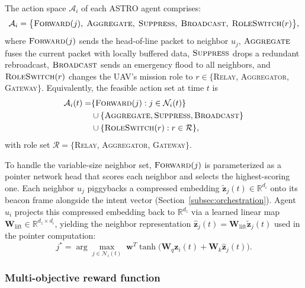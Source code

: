 \documentclass[5p,times]{elsarticle}
\begin{document}
The action space $\mathcal{A}_i$ of each ASTRO agent comprises:
\begin{equation}
\label{eq:action_space}
\mathcal{A}_i = \big\{\textsc{Forward}(j),\; \textsc{Aggregate},\; \textsc{Suppress},\; \textsc{Broadcast},\; \textsc{RoleSwitch}(r)\big\},
\end{equation}
where $\textsc{Forward}(j)$ sends the head-of-line packet to neighbor $u_j$, $\textsc{Aggregate}$ fuses the current packet with locally buffered data, $\textsc{Suppress}$ drops a redundant rebroadcast, $\textsc{Broadcast}$ sends an emergency flood to all neighbors, and $\textsc{RoleSwitch}(r)$ changes the UAV's mission role to $r \in \{$\textsc{Relay}, \textsc{Aggregator}, \textsc{Gateway}$\}$.
Equivalently, the feasible action set at time $t$ is
\begin{equation}
\label{eq:action_space_feasible}
\begin{aligned}
\mathcal{A}_i(t)=&\{\textsc{Forward}(j):j\in\mathcal{N}_i(t)\}\\
&\cup\{\textsc{Aggregate},\textsc{Suppress},\textsc{Broadcast}\}\\
&\cup\{\textsc{RoleSwitch}(r):r\in\mathcal{R}\},
\end{aligned}
\end{equation}
with role set $\mathcal{R}=\{$\textsc{Relay}, \textsc{Aggregator}, \textsc{Gateway}$\}$.

To handle the variable-size neighbor set, $\textsc{Forward}(j)$ is parameterized as a pointer network head that scores each neighbor and selects the highest-scoring one. Each neighbor $u_j$ piggybacks a compressed embedding $\tilde{\mathbf{z}}_j(t) \in \mathbb{R}^{d_\iota}$ onto its beacon frame alongside the intent vector (Section~\ref{subsec:orchestration}). Agent $u_i$ projects this compressed embedding back to $\mathbb{R}^{d_z}$ via a learned linear map $\mathbf{W}_{\mathrm{lift}} \in \mathbb{R}^{d_z \times d_\iota}$, yielding the neighbor representation $\hat{\mathbf{z}}_j(t) = \mathbf{W}_{\mathrm{lift}} \tilde{\mathbf{z}}_j(t)$ used in the pointer computation:
\begin{equation}
\label{eq:pointer}
j^* = \arg\max_{j \in \mathcal{N}_i(t)} \; \mathbf{w}^T \tanh\big(\mathbf{W}_q \mathbf{z}_i(t) + \mathbf{W}_k \hat{\mathbf{z}}_j(t)\big).
\end{equation}

\subsubsection{Multi-objective reward function}
\end{document}
